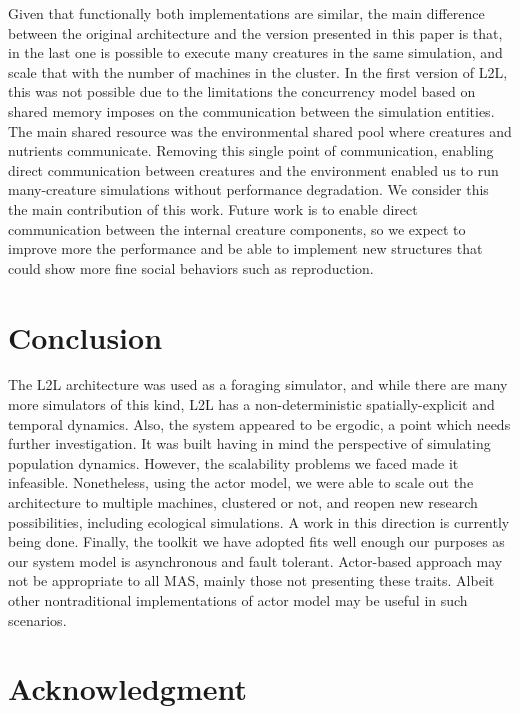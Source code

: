 \documentclass[runningheads]{llncs}
\begin{document}
Given that functionally both implementations are similar, the main difference between the original architecture and the version presented in this paper is that, in the last one is possible to execute many creatures in the same simulation, and scale that with the number of machines in the cluster. In the first version of L2L, this was not possible due to the limitations the concurrency model based on shared memory imposes on the communication between the simulation entities. The main shared resource was the environmental shared pool where creatures and nutrients communicate. Removing this single point of communication, enabling direct communication between creatures and the environment enabled us to run many-creature simulations without performance degradation. We consider this the main contribution of this work. Future work is to enable direct communication between the internal creature components, so we expect to improve more the performance and be able to implement new structures that could show more fine social behaviors such as reproduction. 

\color{black}

\newpage

\section{Conclusion}
\label{sec:conclusion}
The L2L architecture was used as a foraging simulator, and while there are many more simulators of this kind, L2L has a non-deterministic spatially-explicit and temporal dynamics. Also, the system appeared to be ergodic, a point which needs further investigation. It was built having in mind the perspective of simulating population dynamics. However, the scalability problems we faced  made it infeasible. Nonetheless, using the actor model, we were able to scale out the architecture to multiple machines, clustered or not, and reopen new research possibilities, including ecological simulations. A work in this direction is currently being done. Finally, the toolkit we have adopted fits well enough our purposes as our system model is asynchronous and fault tolerant. Actor-based approach may not be appropriate to all MAS, mainly those not presenting these traits. Albeit other nontraditional implementations of actor model may be useful in such scenarios.


\section*{Acknowledgment}
\end{document}
